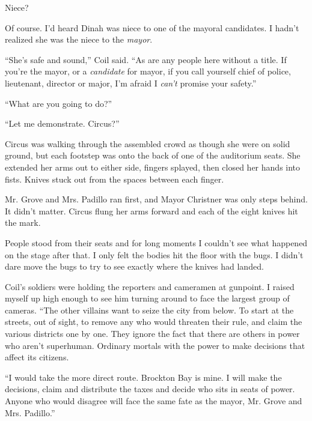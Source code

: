 Niece?



Of course.  I'd heard Dinah was niece to one of the mayoral candidates.  I hadn't realized she was the niece to the \emph{mayor}.



``She's safe and sound,'' Coil said.  ``As are any people here without a title.  If you're the mayor, or a \emph{candidate} for mayor, if you call yourself chief of police, lieutenant, director or major, I'm afraid I \emph{can't} promise your safety.''



``What are you going to do?''



``Let me demonstrate.  Circus?''



Circus was walking through the assembled crowd as though she were on solid ground, but each footstep was onto the back of one of the auditorium seats.  She extended her arms out to either side, fingers splayed, then closed her hands into fists.  Knives stuck out from the spaces between each finger.



Mr. Grove and Mrs. Padillo ran first, and Mayor Christner was only steps behind.  It didn't matter.  Circus flung her arms forward and each of the eight knives hit the mark.



People stood from their seats and for long moments I couldn't see what happened on the stage after that.  I only felt the bodies hit the floor with the bugs.  I didn't dare move the bugs to try to see exactly where the knives had landed.



Coil's soldiers were holding the reporters and cameramen at gunpoint.  I raised myself up high enough to see him turning around to face the largest group of cameras.  ``The other villains want to seize the city from below.  To start at the streets, out of sight, to remove any who would threaten their rule, and claim the various districts one by one.  They ignore the fact that there are others in power who aren't superhuman.  Ordinary mortals with the power to make decisions that affect its citizens.



``I would take the more direct route.  Brockton Bay is mine.  I will make the decisions, claim and distribute the taxes and decide who sits in seats of power.  Anyone who would disagree will face the same fate as the mayor, Mr. Grove and Mrs. Padillo.''



